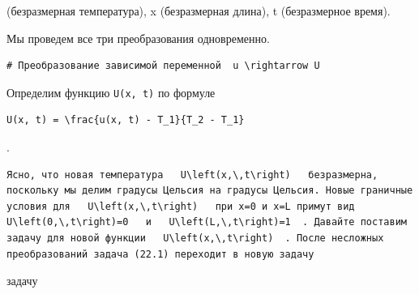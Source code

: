 \documentclass[
  ukrainian,
]{article}
\begin{document}
(безразмерная температура), x \to \xi   (безразмерная длина), t
\to \tau   (безразмерное время).

Мы проведем все три преобразования одновременно.

\begin{verbatim}
# Преобразование зависимой переменной  u \rightarrow U
\end{verbatim}

Определим функцию \texttt{U(x,\ t)} по формуле

\begin{verbatim}
U(x, t) = \frac{u(x, t) - T_1}{T_2 - T_1}
\end{verbatim}

.

\begin{verbatim}
Ясно, что новая температура   U\left(x,\,t\right)   безразмерна, поскольку мы делим градусы Цельсия на градусы Цельсия. Новые граничные условия для   U\left(x,\,t\right)   при x=0 и x=L примут вид   U\left(0,\,t\right)=0   и   U\left(L,\,t\right)=1  . Давайте поставим задачу для новой функции   U\left(x,\,t\right)  . После несложных преобразований задача (22.1) переходит в новую задачу
\end{verbatim}

задачу
\end{document}
